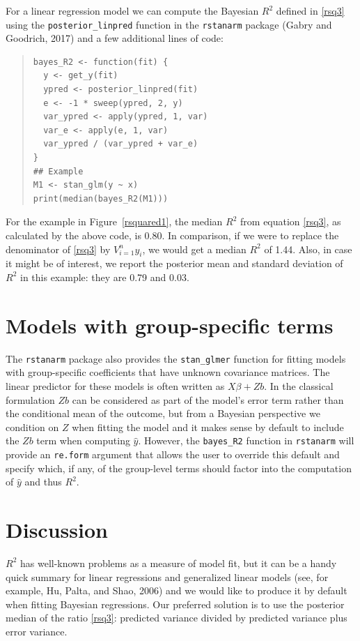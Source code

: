 \documentclass[11pt]{article}
\begin{document}
For a linear regression model we can compute the Bayesian $R^2$ defined in
\eqref{rsq3} using the \verb#posterior_linpred# function in the {\tt rstanarm}
package (Gabry and Goodrich, 2017) and a few additional lines of code:
%
\vspace{-\baselineskip}
\begin{quotation}
\noindent
\begin{small}
\begin{verbatim}
bayes_R2 <- function(fit) {
  y <- get_y(fit)
  ypred <- posterior_linpred(fit)
  e <- -1 * sweep(ypred, 2, y)
  var_ypred <- apply(ypred, 1, var)
  var_e <- apply(e, 1, var)
  var_ypred / (var_ypred + var_e)
}
## Example
M1 <- stan_glm(y ~ x)
print(median(bayes_R2(M1)))
\end{verbatim}
\end{small}
\end{quotation}
%
For the example in Figure~\ref{rsquared1}, the median $R^2$ from
equation \eqref{rsq3}, as calculated by the above code, is 0.80.  In comparison,
if we were to replace the denominator of \eqref{rsq3} by $V_{i=1}^n y_i$, we
would get a median $R^2$ of 1.44.  Also, in case it might be of interest, we
report the posterior mean and standard deviation of $R^2$ in this example:
they are 0.79 and 0.03.

\section{Models with group-specific terms}
The {\tt rstanarm} package also provides the \verb#stan_glmer# function for 
fitting models with group-specific coefficients that have unknown covariance matrices.
The linear predictor for these models is often written as $X \beta + Zb$. 
In the classical formulation $Zb$ can be considered as part of the model's error term
rather than the conditional mean of the outcome, but from a Bayesian perspective we 
condition on $Z$ when fitting the model and it makes sense by default to include the $Zb$ 
term when computing $\hat{y}$. However, the \verb#bayes_R2# function in {\tt rstanarm} will 
provide an {\tt re.form} argument that allows the user to override this default and specify which, 
if any, of the group-level terms should factor into the computation of $\hat{y}$ and thus $R^2$. 

\section{Discussion}
$R^2$ has well-known problems as a measure of model fit, but it can be a handy
quick summary for linear regressions and generalized linear models (see, for
example, Hu, Palta, and Shao, 2006) and we would like to produce it by default
when fitting Bayesian regressions.  Our preferred solution is to use the
posterior median of the ratio \eqref{rsq3}:  predicted variance divided by
predicted variance plus error variance.
\end{document}
